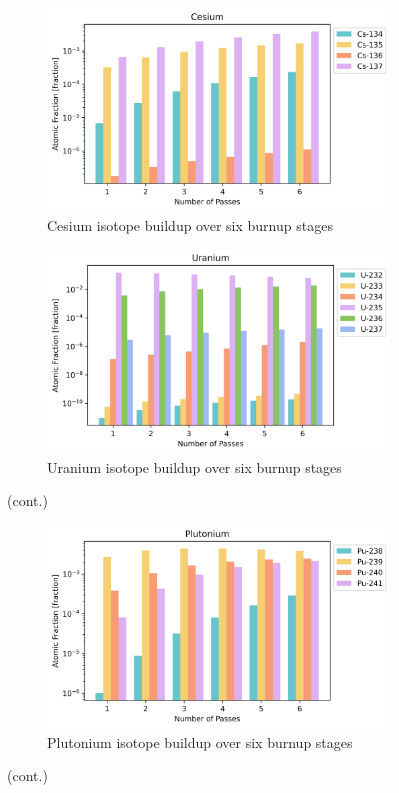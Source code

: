 \begin{figure}[H]\ContinuedFloat
\centering

\begin{subfigure}{0.95\textwidth}
  \includegraphics[width=\linewidth]{figures/compositions/caesium}
  \caption{Cesium isotope buildup over six burnup stages}
  \label{fig:cs}
\end{subfigure}%


\begin{subfigure}{0.95\textwidth}
  \includegraphics[width=\linewidth]{figures/compositions/uranium}
  \caption{Uranium isotope buildup over six burnup stages}
  \label{fig:u}
\end{subfigure}%

\caption[]{(cont.)}
\end{figure}

\begin{figure}[H]\ContinuedFloat
\centering

\begin{subfigure}{0.95\textwidth}
  \includegraphics[width=\linewidth]{figures/compositions/plutonium}
  \caption{Plutonium isotope buildup over six burnup stages}
  \label{fig:pu}
\end{subfigure}%

\caption[]{(cont.)}
\label{fig:comps}
\end{figure}